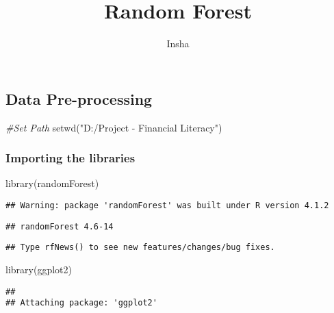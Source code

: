 \documentclass[
]{article}
\title{Random Forest}
\author{Insha}
\date{}
\newenvironment{Shaded}{\begin{snugshade}}{\end{snugshade}}
\newcommand{\CommentTok}[1]{\textcolor[rgb]{0.56,0.35,0.01}{\textit{#1}}}
\newcommand{\FunctionTok}[1]{\textcolor[rgb]{0.00,0.00,0.00}{#1}}
\newcommand{\NormalTok}[1]{#1}
\newcommand{\StringTok}[1]{\textcolor[rgb]{0.31,0.60,0.02}{#1}}
\begin{document}
\maketitle

\hypertarget{data-pre-processing}{%
\subsection{Data Pre-processing}\label{data-pre-processing}}

\begin{Shaded}
\begin{Highlighting}[]
\CommentTok{\#Set Path}
\FunctionTok{setwd}\NormalTok{(}\StringTok{"D:/Project {-} Financial Literacy"}\NormalTok{)}
\end{Highlighting}
\end{Shaded}

\hypertarget{importing-the-libraries}{%
\subsubsection{Importing the libraries}\label{importing-the-libraries}}

\begin{Shaded}
\begin{Highlighting}[]
\FunctionTok{library}\NormalTok{(randomForest)}
\end{Highlighting}
\end{Shaded}

\begin{verbatim}
## Warning: package 'randomForest' was built under R version 4.1.2
\end{verbatim}

\begin{verbatim}
## randomForest 4.6-14
\end{verbatim}

\begin{verbatim}
## Type rfNews() to see new features/changes/bug fixes.
\end{verbatim}

\begin{Shaded}
\begin{Highlighting}[]
\FunctionTok{library}\NormalTok{(ggplot2)}
\end{Highlighting}
\end{Shaded}

\begin{verbatim}
## 
## Attaching package: 'ggplot2'
\end{verbatim}
\end{document}
